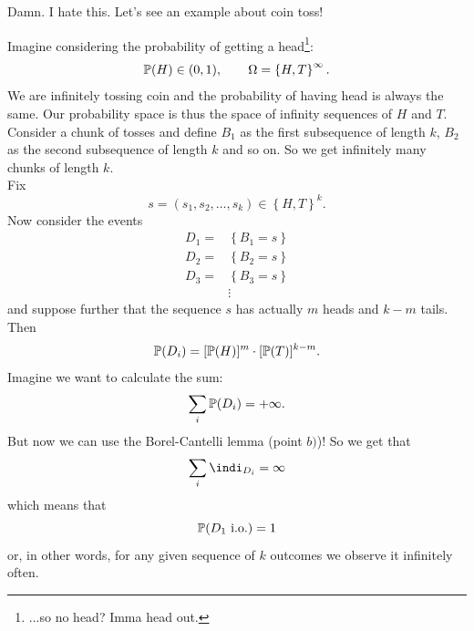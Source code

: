 \documentclass{report}
\begin{document}
Damn. I hate this. Let's see an example about coin toss!
\begin{example}
	Imagine considering the probability of getting a head\footnote{...so no head? Imma head out.}:
	\[\mathbb{P}(H)\in(0,1),\qquad\Omega=\left\{H,T\right\}^\infty.\]
	We are infinitely tossing coin and the probability of having head is always the same. Our probability space is thus the space of infinity sequences of $H$ and $T$. Consider a chunk of tosses and define $B_1$ as the first subsequence of length $k$, $B_2$ as the second subsequence of length $k$ and so on. So we get infinitely many chunks of length $k$.\\
	Fix
	\[s=(s_1,s_2,\ldots,s_k)\in\left\{H,T\right\}^k.\]
	Now consider the events
	\begin{align*}
		D_1=&\left\{B_1=s\right\}\\
		D_2=&\left\{B_2=s\right\}\\
		D_3=&\left\{B_3=s\right\}\\
		&\vdots
	\end{align*}
	and suppose further that the sequence $s$ has actually $m$ heads and $k-m$ tails. Then 
	\[\mathbb{P}(D_i)=[\mathbb{P}(H)]^m\cdot[\mathbb{P}(T)]^{k-m}.\]
	Imagine we want to calculate the sum:
	\[\sum_i\mathbb{P}(D_i)=+\infty.\]
	But now we can use the Borel-Cantelli lemma (point $b)$)! So we get that 
	\[\sum_i\indi_{D_i}=\infty\]
	which means that 
	\[\mathbb{P}(D_1\text{ i.o.})=1\]
	or, in other words, for any given sequence of $k$ outcomes we observe it infinitely often.
\end{example}
\end{document}
